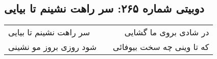\begin{center}
\section*{دوبیتی شماره ۲۶۵: سر راهت نشینم تا بیایی}
\label{sec:265}
\begin{longtable}{l p{0.5cm} r}
سر راهت نشینم تا بیایی
&&
در شادی بروی ما گشایی
\\
شود روزی بروز مو نشینی
&&
که تا وینی چه سخت بیوفائی
\\
\end{longtable}
\end{center}
